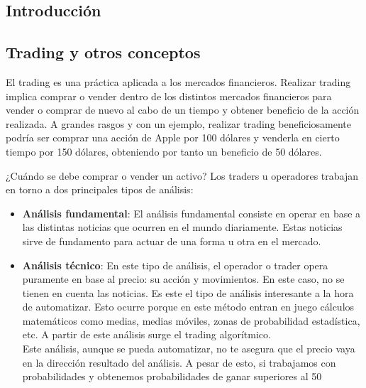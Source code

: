 \begin{titlepage}

\chapter{Introducción}

\section{Trading y otros conceptos}

El trading es una práctica aplicada a los mercados financieros. Realizar trading implica comprar o vender dentro de los distintos mercados financieros para vender o comprar de nuevo al cabo de un tiempo y obtener beneficio de la acción realizada. A grandes rasgos y con un ejemplo, realizar trading beneficiosamente podría ser comprar una acción de Apple por 100 dólares y venderla en cierto tiempo por 150 dólares, obteniendo por tanto un beneficio de 50 dólares. \newline

¿Cuándo se debe comprar o vender un activo? Los traders u operadores trabajan en torno a dos principales tipos de análisis:

\begin{itemize}

	\item \textbf{Análisis fundamental}: El análisis fundamental consiste en operar en base a las distintas noticias que ocurren en el mundo diariamente. Estas noticias sirve de fundamento para actuar de una forma u otra en el mercado.
	\item \textbf{Análisis técnico}: En este tipo de análisis, el operador o trader opera puramente en base al precio: su acción y movimientos. En este caso, no se tienen en cuenta las noticias. Es este el tipo de análisis interesante a la hora de automatizar. Esto ocurre porque en este método entran en juego cálculos matemáticos como medias, medias móviles, zonas de probabilidad estadística, etc. A partir de este análisis surge el trading algorítmico. \\
	Este análisis, aunque se pueda automatizar, no te asegura que el precio vaya en la dirección resultado del análisis. A pesar de esto, si trabajamos con probabilidades y obtenemos probabilidades de ganar superiores al 50%
	
\end{itemize}


\end{titlepage}
